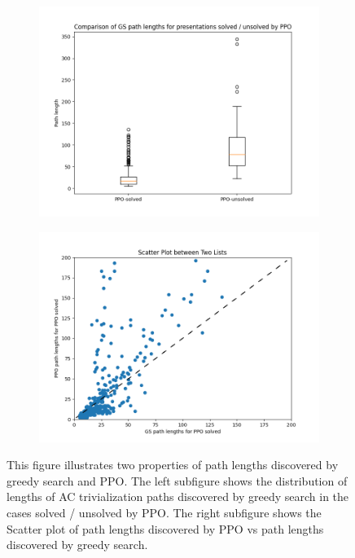 \begin{figure}
	\centering
	\begin{subfigure}[b]{0.5\textwidth}
		\includegraphics[width=\textwidth]{fig/path_lengths_ppo_solved_vs_unsolved.png}
		\caption{}
	\label{fig:path_lengths_ppo_solved_vs_unsolved}
	\end{subfigure}%
	\begin{subfigure}[b]{0.5\textwidth}
		\centering
		\includegraphics[width=1.1\textwidth]{fig/path_lengths_gs_vs_ppo.png}
		\caption{}
		\label{fig:path_lengths_gs_vs_ppo}
	\end{subfigure}
	\caption{This figure illustrates two properties of path lengths discovered by greedy search and PPO. The left subfigure shows the distribution of lengths of AC trivialization paths discovered by greedy search in the cases solved / unsolved by PPO. The right subfigure shows the Scatter plot of path lengths discovered by PPO vs path lengths discovered by greedy search.}
	\label{fig:path_lengths_gs_vs_ppo_full}
\end{figure}

